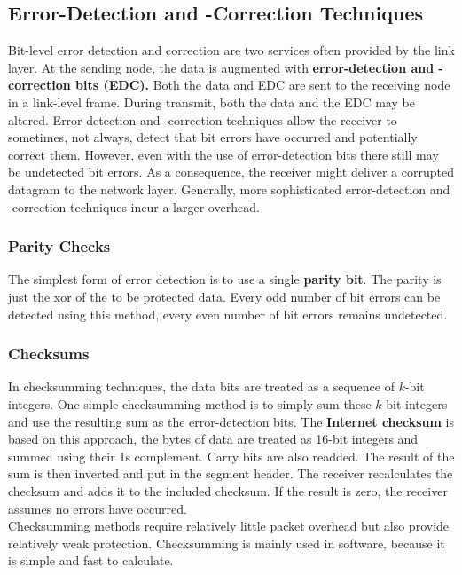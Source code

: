 \subsection{Error-Detection and -Correction Techniques}
Bit-level error detection and correction are two services often provided by the link layer. At the sending node, the data is augmented with \textbf{error-detection and -correction bits (EDC).} Both the data and EDC are sent to the receiving node in a link-level frame. During transmit, both the data and the EDC may be altered. Error-detection and -correction techniques allow the receiver to sometimes, not always, detect that bit errors have occurred and potentially correct them. However, even with the use of error-detection bits there still may be undetected bit errors. As a consequence, the receiver might deliver a corrupted datagram to the network layer. Generally, more sophisticated error-detection and -correction techniques incur a larger overhead. 

\subsubsection{Parity Checks}
The simplest form of error detection is to use a single \textbf{parity bit}. The parity is just the xor of the to be protected data. Every odd number of bit errors can be detected using this method, every even number of bit errors remains undetected.

\subsubsection{Checksums}
In checksumming techniques, the data bits are treated as a sequence of $k$-bit integers. One simple checksumming method is to simply sum these $k$-bit integers and use the resulting sum as the error-detection bits. The \textbf{Internet checksum} is based on this approach, the bytes of data are treated as 16-bit integers and summed using their 1s complement. Carry bits are also readded. The result of the sum is then inverted and put in the segment header. The receiver recalculates the checksum and adds it to the included checksum. If the result is zero, the receiver assumes no errors have occurred.\\
Checksumming methods require relatively little packet overhead but also provide relatively weak protection. Checksumming is mainly used in software, because it is simple and fast to calculate.

